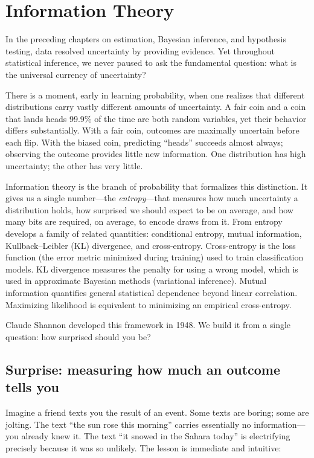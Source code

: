 \chapter{Information Theory}

In the preceding chapters on estimation, Bayesian inference, and hypothesis testing, data resolved
uncertainty by providing evidence. Yet throughout statistical inference, we never paused to ask the
fundamental question: what is the universal currency of uncertainty?

There is a moment, early in learning probability, when one realizes that different distributions
carry vastly different amounts of uncertainty. A fair coin and a coin that lands heads 99.9\% of the time are both
random variables, yet their behavior differs substantially. With a fair coin, outcomes are maximally uncertain
before each flip. With the biased coin, predicting ``heads'' succeeds almost always; observing the outcome
provides little new information. One distribution has high uncertainty; the other has very little.

Information theory is the branch of probability that formalizes this distinction. It
gives us a single number---the \emph{entropy}---that measures how much uncertainty a distribution holds,
how surprised we should expect to be on average, and how many bits are required, on average, to
encode draws from it. From entropy develops a family of related quantities: conditional entropy, mutual
information, Kullback--Leibler (KL) divergence, and cross-entropy. Cross-entropy is the loss
function (the error metric minimized during training) used to train classification models. KL divergence
measures the penalty for using a wrong model, which is used in approximate Bayesian methods (variational
inference). Mutual information quantifies general statistical dependence beyond linear correlation.
Maximizing likelihood is equivalent to minimizing an empirical cross-entropy.

Claude Shannon developed this framework in 1948. We build it from a single
question: how surprised should you be?

\chapterline

\section{Surprise: measuring how much an outcome tells you}
\label{ch33:surprise}

Imagine a friend texts you the result of an event. Some texts are boring; some are jolting. The text
``the sun rose this morning'' carries essentially no information---you already knew it. The text ``it
snowed in the Sahara today'' is electrifying precisely because it was so unlikely. The lesson is immediate
and intuitive:

